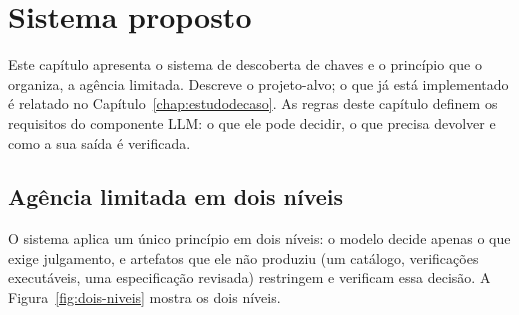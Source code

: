 \chapter{Sistema proposto}
\label{chap:arquitetura}

Este capítulo apresenta o sistema de descoberta de chaves e o princípio que o
organiza, a agência limitada. Descreve o projeto-alvo; o que já está
implementado é relatado no Capítulo~\ref{chap:estudodecaso}. As regras deste
capítulo definem os requisitos do componente LLM: o que ele pode decidir, o
que precisa devolver e como a sua saída é verificada.

\section{Agência limitada em dois níveis}
\label{sec:arquitetura-visao-geral-das-tres-camadas}

O sistema aplica um único princípio em dois níveis: o modelo decide apenas o
que exige julgamento, e artefatos que ele não produziu (um catálogo,
verificações executáveis, uma especificação revisada) restringem e verificam
essa decisão. A Figura~\ref{fig:dois-niveis} mostra os dois níveis.

